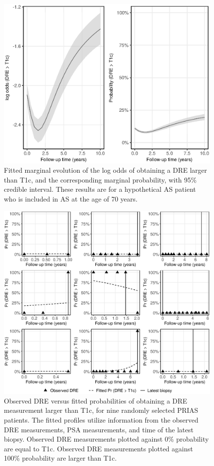 \begin{figure}[!htb]
\centerline{\includegraphics[width=\columnwidth]{images/marginal_dre_both.eps}}
\caption{Fitted marginal evolution of the log odds of obtaining a DRE larger than T1c, and the corresponding marginal probability, with 95\% credible interval. These results are for a hypothetical AS patient who is included in AS at the age of 70 years.}
\label{fig:fitted_marginal_dre}
\end{figure}

\begin{figure}[!htb]
\centerline{\includegraphics[width=\columnwidth]{images/fitted_9subject_dre.eps}}
\caption{Observed DRE versus fitted probabilities of obtaining a DRE measurement larger than T1c, for nine randomly selected PRIAS patients. The fitted profiles utilize information from the observed DRE measurements, PSA measurements, and time of the latest biopsy. Observed DRE measurements plotted against 0\% probability are equal to T1c. Observed DRE measurements plotted against 100\% probability are larger than T1c.}
\label{fig:fitted_9subject_dre}
\end{figure}


